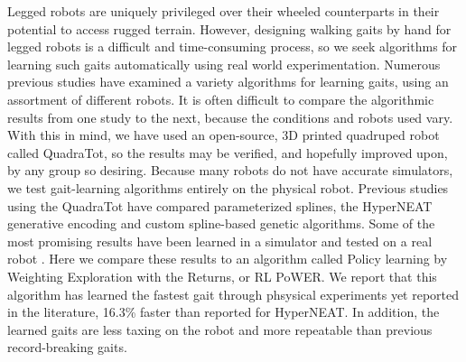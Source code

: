%

Legged robots are uniquely privileged over their wheeled counterparts
in their potential to access rugged terrain. However, designing
walking gaits by hand for legged robots is a difficult and
time-consuming process, so we seek algorithms for learning such gaits
automatically using real world experimentation. Numerous previous
studies have examined a variety algorithms for learning gaits, using
an assortment of different robots. It is often difficult to compare
the algorithmic results from one study to the next, because the
conditions and robots used vary. With this in mind, we have used an
open-source, 3D printed quadruped robot called QuadraTot, so the results may be
verified, and hopefully improved upon, by any group so
desiring. Because many robots do not have accurate simulators, we test
gait-learning algorithms entirely on the physical robot. Previous
studies using the QuadraTot have compared parameterized splines, the
HyperNEAT generative encoding and custom spline-based genetic algorithms. Some of the most promising results 
have been learned in a simulator and tested on a real robot \citep{glette2012evolution-of-locomotion-in-a-simulated}. Here we
compare these results to an algorithm called Policy learning by
Weighting Exploration with the Returns, or RL PoWER. We report that
this algorithm has learned the fastest gait through phsysical experiments yet reported in the
literature, 16.3\% faster than reported for HyperNEAT. In addition, the learned gaits are less taxing
on the robot and more repeatable than previous record-breaking gaits. 
